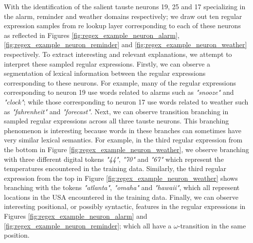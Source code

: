 With the identification of the salient \ac{tauste} neurons 19, 25 and 17 specializing
in the alarm, reminder and weather domains respectively; we draw out ten regular
expression samples from \ac{re} lookup layer corresponding to each of these neurons
as reflected in Figures \ref{fig:regex_example_neuron_alarm},
\ref{fig:regex_example_neuron_reminder} and
\ref{fig:regex_example_neuron_weather} respectively. To extract interesting and
relevant explanations, we attempt to interpret these sampled regular
expressions. Firstly, we can observe a segmentation of lexical information
between the regular expressions corresponding to these neurons. For example,
many of the regular expressions corresponding to neuron 19 use words related to
alarms such as \textit{"snooze"} and \textit{"clock"}; while those corresponding to neuron 17 use
words related to weather such as \textit{"fahrenheit"} and \textit{"forecast"}. Next, we can
observe transition branching in sampled regular expressions across
all three \ac{tauste} neurons. This branching phenomenon is interesting because words
in these branches can sometimes have very similar lexical semantics. For
example, in the third regular expression from the bottom in Figure
\ref{fig:regex_example_neuron_weather}, we observe branching with three
different digital tokens \textit{"44"}, \textit{"70"} and \textit{"67"} which
represent the temperatures encountered in the training data. Similarly, the
third regular expression from the top in Figure
\ref{fig:regex_example_neuron_weather} shows branching with the tokens
\textit{"atlanta"}, \textit{"omaha"} and \textit{"hawaii"}, which all represent
locations in the USA encountered in the training data. Finally, we can observe
interesting positional, or possibly syntactic, features in the regular
expressions in Figures \ref{fig:regex_example_neuron_alarm} and
\ref{fig:regex_example_neuron_reminder}; which all have a $\omega$-transition in
the same position.

